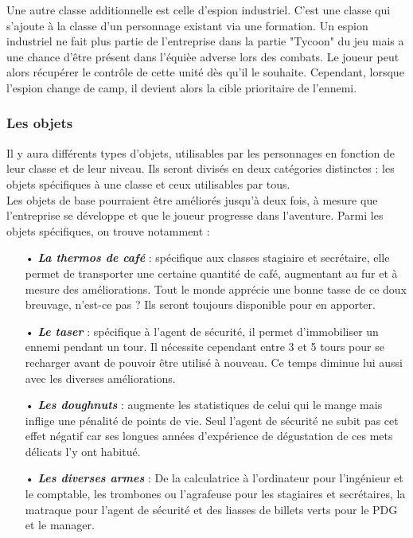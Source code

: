 \documentclass{article}
\begin{document}
Une autre classe additionnelle est celle d'espion industriel. C'est une classe qui s'ajoute à la classe d'un personnage existant via une formation. Un espion industriel ne fait plus partie de l'entreprise dans la partie "Tycoon" du jeu mais a une chance d'être présent dans l'équièe adverse lors des combats. Le joueur peut alors récupérer le contrôle de cette unité dès qu'il le souhaite. Cependant, lorsque l'espion change de camp, il devient alors la cible prioritaire de l'ennemi.

\subsubsection{Les objets}

Il y aura différents types d'objets, utilisables par les personnages en fonction de leur classe et de leur niveau. Ils seront divisés en deux catégories distinctes : les objets spécifiques à une classe et ceux utilisables par tous.\\
Les objets de base pourraient être améliorés jusqu'à deux fois, à mesure que l'entreprise se développe et que le joueur progresse dans l'aventure.
Parmi les objets spécifiques, on trouve notamment : \\
\begin{itemize}
\item[•] \textbf{\textit{La thermos de café}} : spécifique aux classes stagiaire et secrétaire, elle permet de transporter une certaine quantité de café, augmentant au fur et à mesure des améliorations. Tout le monde apprécie une bonne tasse de ce doux breuvage, n'est-ce pas ? Ils seront toujours disponible pour en apporter.\\
\item[•] \textbf{\textit{Le taser}} : spécifique à l'agent de sécurité, il permet d'immobiliser un ennemi pendant un tour. Il nécessite cependant entre 3 et 5 tours pour se recharger avant de pouvoir être utilisé à nouveau. Ce temps diminue lui aussi avec les diverses améliorations.\\
\item[•] \textbf{\textit{Les doughnuts}} : augmente les statistiques de celui qui le mange mais inflige une pénalité de points de vie. Seul l'agent de sécurité ne subit pas cet effet négatif car ses longues années d'expérience de dégustation de ces mets délicats l'y ont habitué.\\
\item[•] \textbf{\textit{Les diverses armes}} : De la calculatrice à l'ordinateur pour l'ingénieur et le comptable, les trombones ou l'agrafeuse pour les stagiaires et secrétaires, la matraque pour l'agent de sécurité et des liasses de billets verts pour le PDG et le manager.
\end{itemize}
\end{document}
